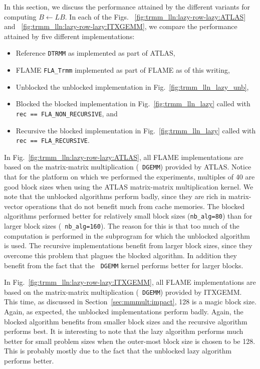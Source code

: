 In this section, we discuss the performance attained by the different
variants for computing $ B \leftarrow L B $.  In each of the Figs.
~\ref{fig:trmm_lln:lazy-row-lazy:ATLAS} and
~\ref{fig:trmm_lln:lazy-row-lazy:ITXGEMM}, we compare the performance
attained by five different implementations:
\begin{itemize}
\item{Reference}
{\tt DTRMM} as implemented as part of ATLAS,
\item{FLAME}
{\tt FLA\_Trmm} implemented as part of FLAME
as of this writing,
\item{Unblocked}
the unblocked implementation in Fig.~\ref{fig:trmm_lln_lazy_unb},
\item{Blocked}
the blocked implementation in Fig.~\ref{fig:trmm_lln_lazy}
called with 
{\tt rec == 
%
FLA\_NON\_RECURSIVE}, and
\item{Recursive}
the blocked implementation in Fig.~\ref{fig:trmm_lln_lazy}
called with 
{\tt rec == 
%
FLA\_RECURSIVE}.
\end{itemize}
In Fig.~\ref{fig:trmm_lln:lazy-row-lazy:ATLAS}, all FLAME
implementations are based on the matrix-matrix multiplication ({\tt
DGEMM}) provided by ATLAS.  Notice that for the platform on which we
performed the experiments, multiples of 40 are good block sizes when
using the ATLAS matrix-matrix multiplication kernel.  We note that the
unblocked algorithms perform badly, since they are rich in
matrix-vector operations that do not benefit much from cache memories.
The blocked algorithms performed better for relatively small block
sizes ({\tt nb\_alg=80}) than for larger block sizes ({\tt
nb\_alg=160}).  The reason for this is that too much of the
computation is performed in the subprogram for which the unblocked
algorithm is used.  The recursive implementations benefit from larger
block sizes, since they overcome this problem that plagues the blocked
algorithm.  In addition they benefit from the fact that the {\tt
DGEMM} kernel performs better for larger blocks.

In Fig.~\ref{fig:trmm_lln:lazy-row-lazy:ITXGEMM}, all FLAME
implementations are based on the matrix-matrix multiplication ({\tt
DGEMM}) provided by ITXGEMM.  This time, as discussed in
Section~\ref{sec:mmmult:impact}, 128 is a magic block size.  Again, as
expected, the unblocked implementations perform badly.  Again, the
blocked algorithm benefits from smaller block sizes and the recursive
algorithm performs best.  It is interesting to note that the lazy
algorithm performs much better for small problem sizes when the
outer-most block size is chosen to be 128.  This is probably mostly
due to the fact that the unblocked lazy algorithm performs better.

